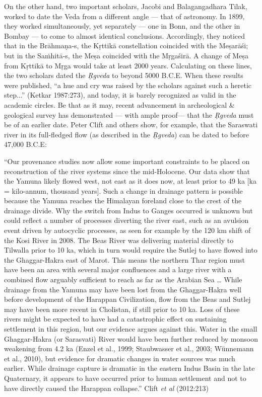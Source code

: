 On the other hand, two important scholars, Jacobi and Balagangadhara Tilak, worked to date the Veda from a different angle --- that of astronomy. In 1899, they worked simultaneously, yet separately --- one in Bonn, and the other in Bombay --- to come to almost identical conclusions. Accordingly, they noticed that in the Brāhmaṇa-s, the Kṛttikā constellation coincided with the Meṣarāśi; but in the \hbox{Saṁhitā-s}, the Meṣa coincided with the Mṛgaśirā. A change of Meṣa from Kṛttikā to Mṛga would take at least 2000 years. Calculating on these lines, the two scholars dated the {\sl Ṛgveda} to beyond 5000 B.C.E.  When these results were published, “a hue and cry was raised by the scholars against such a heretic step...” (Ketkar 1987:273), and today, it is barely recognized as valid in the academic circles. Be that as it may, recent advancement in archeological \& geological survey has demonstrated --- with ample proof--- that the {\sl Ṛgveda} must be of an earlier date. Peter Clift and others show, for example, that the Saraswati river in its full-fledged flow (as described in the {\sl Ṛgveda}) can be dated to before 47,000 B.C.E: 

\begin{myquote}
“Our provenance studies now allow some important constraints to be placed on reconstruction of the river systems since the mid-Holocene. Our data show that the Yamuna likely flowed west, not east as it does now, at least prior to 49 ka [ka = kilo-annum, thousand years]. Such a change in drainage pattern is possible because the Yamuna reaches the Himalayan foreland close to the crest of the drainage divide. Why the switch from Indus to Ganges occurred is unknown but could reflect a number of processes diverting the river east, such  as an avulsion event driven by autocyclic processes, as seen for example by the 120 km shift of the Kosi River in 2008. The Beas River was delivering material directly to Tilwalla prior to 10 ka, which in turn would require the Sutlej to have flowed into the Ghaggar-Hakra east of Marot. This means the northern Thar region must have been an area with several major confluences and a large river with a combined flow arguably sufficient to reach as far as the Arabian Sea … While drainage from the Yamuna may have been lost from the Ghaggar-Hakra well before development of the Harappan Civilization, flow from the Beas and Sutlej may have been more recent in Cholistan, if still prior to 10 ka. Loss of these rivers might be expected to have had a catastrophic effect on sustaining settlement in this region, but our evidence argues against this. Water in the small Ghaggar-Hakra (or Sarasvati) River would have been further reduced by monsoon weakening from 4.2 ka (Enzel et al., 1999; Staubwasser et al., 2003; Wünnemann et al., 2010), but evidence for dramatic changes in water sources was much earlier. While drainage capture is dramatic in the eastern Indus Basin in the late Quaternary, it appears to have occurred prior to human settlement and not to have directly caused the Harappan collapse.”
\hfill Clift {\sl et al} (2012:213)
\end{myquote}

